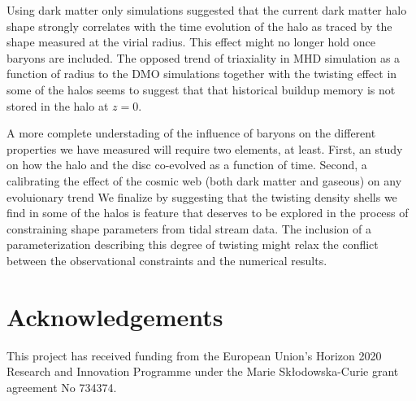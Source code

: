 \documentclass[usenatbib]{mnras}
\begin{document}
Using dark matter only simulations \cite{VeraCiro11} suggested that
the current dark matter halo shape strongly correlates with the time
evolution of the halo as traced by the shape measured at the virial radius. 
This effect might no longer hold once baryons are included. 
The opposed trend of triaxiality in MHD simulation as a function of
radius to the DMO simulations together with the twisting effect in some of 
the halos seems to suggest that that historical buildup memory is not
stored in the halo at $z=0$.


A more complete understading of the influence of baryons on the
different properties we have measured will require two elements, at
least. First, an study on how the halo and the disc co-evolved as a
function of time. Second, a calibrating the effect of the cosmic web
(both dark matter and gaseous) on any evoluionary trend
\citep{2014MNRAS.443.1090F,2017MNRAS.469..594B,2019MNRAS.487.1607G} 
We finalize by suggesting that the twisting density shells we find in
some of the halos is feature that deserves to be explored in the
process of constraining shape parameters from tidal stream data.  The
inclusion of a parameterization describing this degree of twisting
might relax the conflict between the observational constraints and the
numerical results.  


\section*{Acknowledgements}
This project has received funding from the European Union's Horizon
2020 Research and Innovation Programme under the Marie
Sk\l{}odowska-Curie grant agreement No 734374. 

 
 
\end{document}
